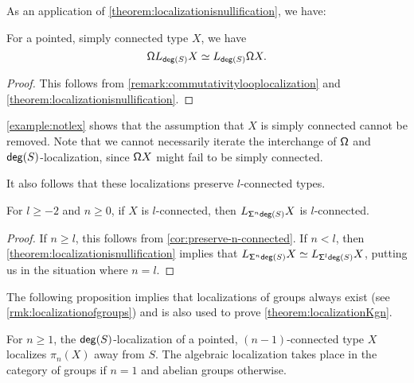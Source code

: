 As an application of \cref{theorem:localizationisnullification}, we have:

\begin{cor}\label{corollary:commutativitylooplocalizationsimpconn}
    For a pointed, simply connected type $X$, we have
    \[
        \loopspacesym L_{\degg(S)} X \simeq L_{\degg(S)} \loopspacesym X.
    \]
\end{cor}

\begin{proof}
This follows from \cref{remark:commutativitylooplocalization} and \cref{theorem:localizationisnullification}.
\end{proof}

\cref{example:notlex} shows that the assumption that $X$ is simply connected cannot be removed.
Note that we cannot necessarily iterate the interchange of $\loopspacesym$ and $\degg(S)$-localization,
since $\loopspacesym X$ might fail to be simply connected.

\medskip

It also follows that these localizations preserve $l$-connected types.

\begin{cor}\label{corollary:plocalizationpreservesconnectedness}
    For $l \geq -2$ and $n \geq 0$, if $X$ is $l$-connected, then $L_{\susp[n] \degg(S)} X$ is $l$-connected.
\end{cor}

\begin{proof}
    If $n \geq l$, this follows from \cref{cor:preserve-n-connected}.
    If $n < l$, then \cref{theorem:localizationisnullification} implies
    that $L_{\susp[n] \degg(S)} X \eqvsym L_{\susp[l] \degg(S)} X$, putting us
    in the situation where $n = l$.
\end{proof}

The following proposition implies that localizations of groups always exist
(see \cref{rmk:localizationofgroups})
and is also used to prove \cref{theorem:localizationKgn}.

\begin{prp}\label{lemma:localizationlocalizesfirst}
    For $n \geq 1$,
    the $\degg(S)$-localization of a pointed, $(n-1)$-connected type $X$ localizes $\pi_n(X)$ away from $S$.
    The algebraic localization takes place in the category of groups if $n = 1$ and
    abelian groups otherwise.
\end{prp}

